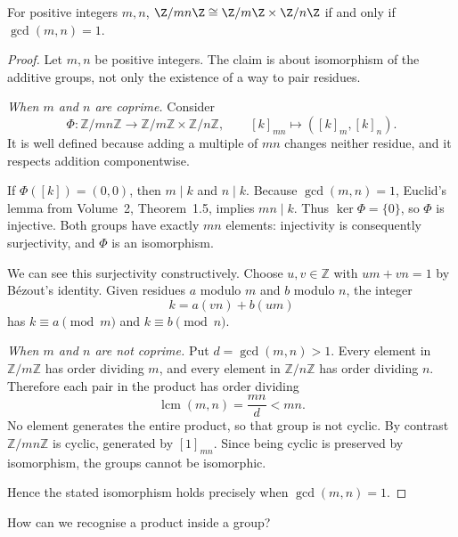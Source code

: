 \begin{theorem}\label{thm:crt}
For positive integers $m,n$, $\Z/mn\Z\cong\Z/m\Z\times\Z/n\Z$ if and only if $\gcd(m,n)=1$.
\end{theorem}
\begin{proof}
Let $m,n$ be positive integers. The claim is
about isomorphism of the additive groups, not
only the existence of a way to pair residues.

\emph{When $m$ and $n$ are coprime.}
Consider
\[
\Phi:\mathbb Z/mn\mathbb Z\to
\mathbb Z/m\mathbb Z\times\mathbb Z/n\mathbb Z,
\qquad[k]_{mn}\mapsto([k]_m,[k]_n).
\]
It is well defined because adding a multiple
of $mn$ changes neither residue, and it
respects addition componentwise.

If $\Phi([k])=(0,0)$, then $m\mid k$
and $n\mid k$. Because $\gcd(m,n)=1$,
Euclid's lemma from Volume~2, Theorem~1.5, implies $mn\mid k$.
Thus $\ker\Phi=\{0\}$, so $\Phi$ is injective.
Both groups have exactly $mn$ elements:
injectivity is consequently surjectivity, and
$\Phi$ is an isomorphism.

We can see this surjectivity constructively.
Choose $u,v\in\mathbb Z$ with $um+vn=1$
by Bézout's identity. Given residues $a$
modulo $m$ and $b$ modulo $n$, the integer
\[
k=a(vn)+b(um)
\]
has $k\equiv a\pmod m$ and
$k\equiv b\pmod n$.

\emph{When $m$ and $n$ are not coprime.}
Put $d=\gcd(m,n)>1$. Every element in
$\mathbb Z/m\mathbb Z$ has order dividing $m$,
and every element in $\mathbb Z/n\mathbb Z$
has order dividing $n$. Therefore each pair
in the product has order dividing
\[
\operatorname{lcm}(m,n)=\frac{mn}{d}<mn.
\]
No element generates the entire product, so
that group is not cyclic. By contrast
$\mathbb Z/mn\mathbb Z$ is cyclic, generated by
$[1]_{mn}$. Since being cyclic is preserved
by isomorphism, the groups cannot be isomorphic.

Hence the stated isomorphism holds precisely
when $\gcd(m,n)=1$.
\end{proof}

How can we recognise a product inside a group?


